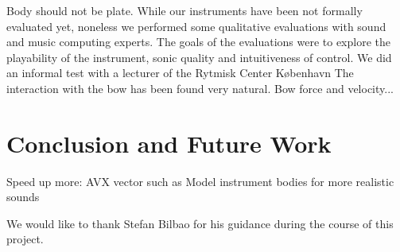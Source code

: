 \documentclass{article}
\begin{document}
Body should not be plate.
While our instruments have been not formally evaluated yet, noneless we performed some qualitative evaluations with sound and music computing experts.
The goals of the evaluations were to explore the playability of the instrument, sonic quality and intuitiveness of control.
We did an informal test with a lecturer of the Rytmisk Center København 
The interaction with the bow has been found very natural. Bow force and velocity... 

\section{Conclusion and Future Work}\label{sec:conclusion}
Speed up more: AVX vector such as \cite{Webb2015}
Model instrument bodies for more realistic sounds


\begin{acknowledgments}
We would like to thank Stefan Bilbao for his guidance during the course of this project. 
\end{acknowledgments} 


\end{document}
